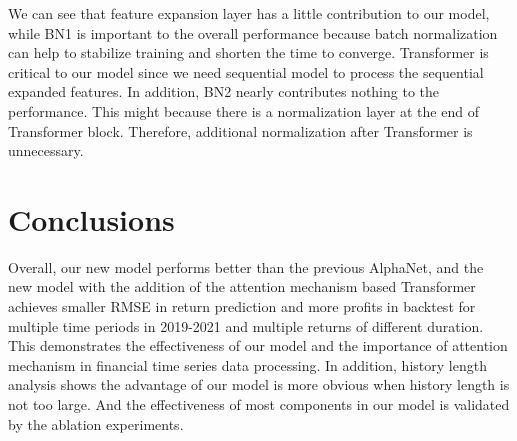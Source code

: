 \documentclass{article}
\begin{document}
\hspace{16}We can see that feature expansion layer has a little contribution to our model, while BN1 is important to the overall performance because batch normalization can help to stabilize training and shorten the time to converge. Transformer is critical to our model since we need sequential model to process the sequential expanded features. In addition, BN2 nearly contributes nothing to the performance. This might because there is a normalization layer at the end of Transformer block. Therefore, additional normalization after Transformer is unnecessary.




\section{Conclusions}
\hspace{16}Overall, our new model performs better than the previous AlphaNet, and the new model with the addition of the attention mechanism based Transformer achieves smaller RMSE in return prediction and more profits in backtest for multiple time periods in 2019-2021 and multiple returns of different duration. This demonstrates the effectiveness of our model and the importance of attention mechanism in financial time series data processing. In addition, history length analysis shows the advantage of our model is more obvious when history length is not too large. And the effectiveness of most components in our model is validated by the ablation experiments.




\end{document}
